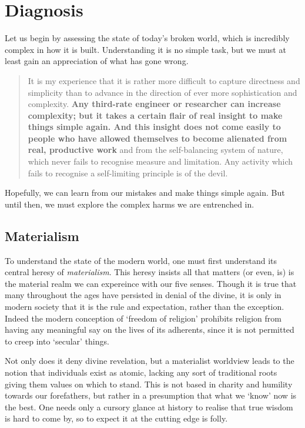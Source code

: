 \documentclass[letterpaper]{article}
\begin{document}
\section{Diagnosis}

Let us begin by assessing the state of today's broken world, which is incredibly complex in how it is built. Understanding it is no simple task, but we must at least gain an appreciation of what has gone wrong.

\begin{quote}
  It is my experience that it is rather more difficult to capture directness and simplicity than to advance in the direction of ever more sophistication and complexity. \textbf{Any third-rate engineer or researcher can increase complexity; but it takes a certain flair of real insight to make things simple again. And this insight does not come easily to people who have allowed themselves to become alienated from real, productive work} and from the self-balancing system of nature, which never fails to recognise measure and limitation. Any activity which fails to recognise a self-limiting principle is of the devil.
\end{quote}

Hopefully, we can learn from our mistakes and make things simple again. But until then, we must explore the complex harms we are entrenched in.

\subsection{Materialism}

To understand the state of the modern world, one must first understand its central heresy of \textit{materialism}. This heresy insists all that matters (or even, is) is the material realm we can expereince with our five senses. Though it is true that many throughout the ages have persisted in denial of the divine, it is only in modern society that it is the rule and expectation, rather than the exception. Indeed the modern conception of `freedom of religion' prohibits religion from having any meaningful say on the lives of its adherents, since it is not permitted to creep into `secular' things.

Not only does it deny divine revelation, but a materialist worldview leads to the notion that individuals exist as atomic, lacking any sort of traditional roots giving them values on which to stand. This is not based in charity and humility towards our forefathers, but rather in a presumption that what we `know' now is the best. One needs only a cursory glance at history to realise that true wisdom is hard to come by, so to expect it at the cutting edge is folly.
\end{document}
